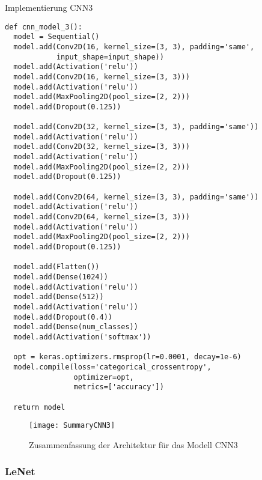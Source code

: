 \begin{listing} [H]
	\caption{Implementierung CNN3}
	\label{lst:cnn3}
	\begin{verbatim}
def cnn_model_3():
  model = Sequential()
  model.add(Conv2D(16, kernel_size=(3, 3), padding='same',
            input_shape=input_shape))
  model.add(Activation('relu'))
  model.add(Conv2D(16, kernel_size=(3, 3)))
  model.add(Activation('relu'))
  model.add(MaxPooling2D(pool_size=(2, 2)))
  model.add(Dropout(0.125))

  model.add(Conv2D(32, kernel_size=(3, 3), padding='same'))
  model.add(Activation('relu'))
  model.add(Conv2D(32, kernel_size=(3, 3)))
  model.add(Activation('relu'))
  model.add(MaxPooling2D(pool_size=(2, 2)))
  model.add(Dropout(0.125))

  model.add(Conv2D(64, kernel_size=(3, 3), padding='same'))
  model.add(Activation('relu'))
  model.add(Conv2D(64, kernel_size=(3, 3)))
  model.add(Activation('relu'))
  model.add(MaxPooling2D(pool_size=(2, 2)))
  model.add(Dropout(0.125))

  model.add(Flatten())
  model.add(Dense(1024))
  model.add(Activation('relu'))
  model.add(Dense(512))
  model.add(Activation('relu'))
  model.add(Dropout(0.4))
  model.add(Dense(num_classes))
  model.add(Activation('softmax'))

  opt = keras.optimizers.rmsprop(lr=0.0001, decay=1e-6)
  model.compile(loss='categorical_crossentropy',
                optimizer=opt,
                metrics=['accuracy'])

  return model	
	\end{verbatim}
\end{listing} 

\begin{figure} [H]
	\centering
	\texttt{[image: SummaryCNN3]}
	\caption{Zusammenfassung der Architektur für das Modell CNN3}
	\label{pic:summary-cnn3}
\end{figure}

\subsubsection{LeNet}

